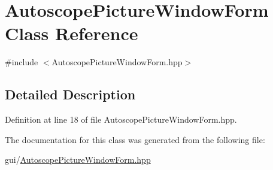 \hypertarget{class_autoscope_picture_window_form}{}\section{Autoscope\+Picture\+Window\+Form Class Reference}
\label{class_autoscope_picture_window_form}


{\ttfamily \#include $<$Autoscope\+Picture\+Window\+Form.\+hpp$>$}



\subsection{Detailed Description}


Definition at line 18 of file Autoscope\+Picture\+Window\+Form.\+hpp.



The documentation for this class was generated from the following file\+:\begin{DoxyCompactItemize}
\item 
gui/\mbox{\hyperlink{_autoscope_picture_window_form_8hpp}{Autoscope\+Picture\+Window\+Form.\+hpp}}\end{DoxyCompactItemize}
